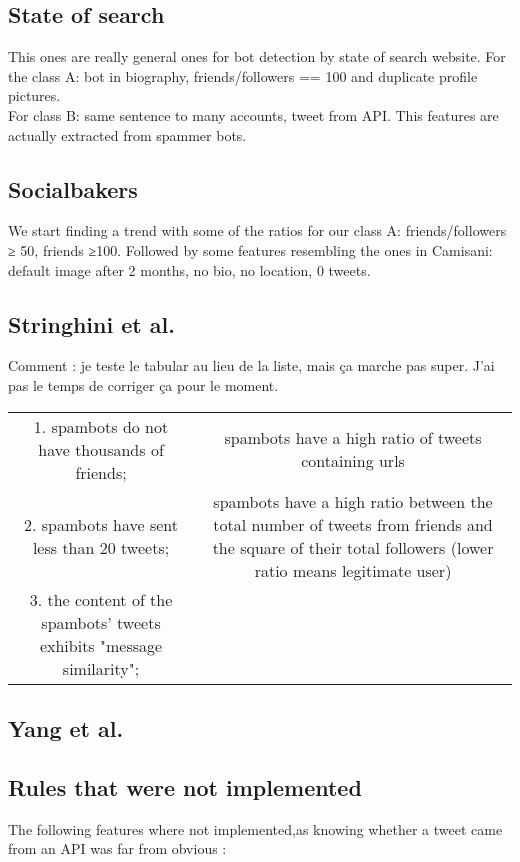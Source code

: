 \documentclass[a4paper,11pt]{article}
\begin{document}
\subsection{State of search}
This ones are really general ones for bot detection by state of search website.
For the class A: bot in biography, friends/followers == 100 and duplicate profile pictures.\\
For class B: same sentence to many accounts, tweet from API.
This features are actually extracted from spammer bots.
\subsection{Socialbakers}
We start finding a trend with some of the ratios for our class A: friends/followers ≥ 50, friends ≥100. Followed by some features resembling the ones in Camisani: default image after 2 months, no bio, no location, 0 tweets.\\
\subsection{Stringhini et al.}

Comment : je teste le tabular au lieu de la liste, mais ça marche pas super. J'ai pas le temps de corriger ça pour le moment.\\

\begin{tabular}{cc}
\hline
1. spambots do not have thousands of friends; & spambots have a high ratio of tweets containing urls\\
2. spambots have sent less than 20 tweets; & spambots have a high ratio between the total number of tweets from friends and the square of their total followers (lower ratio means legitimate user)\\
3. the content of the spambots' tweets exhibits "message similarity"; & \\
\hline
\end{tabular}


\subsection{Yang et al.}

\subsection{Rules that were not implemented}
The following features where not implemented,as knowing whether a tweet came from an API was far from obvious : \\
\end{document}
